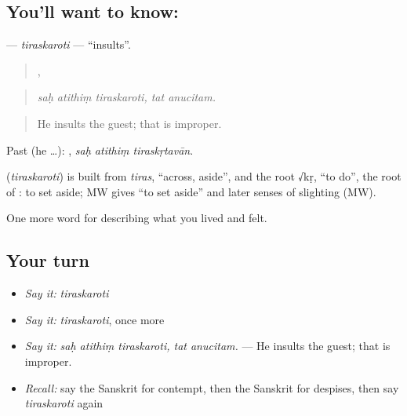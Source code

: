\subsection*{You'll want to know: }
\textbf{} — \emph{tiraskaroti} — \textquotedblleft{}insults\textquotedblright{}.

\begin{quote}
  ,  
\end{quote}

\begin{quote}
\emph{saḥ atithiṃ tiraskaroti, tat anucitam.}
\end{quote}

\begin{quote}
He insults the guest; that is improper.
\end{quote}

Past (he …):   , \emph{saḥ atithiṃ tiraskṛtavān}.

\begin{cousinweb}
\textbf{} (\emph{tiraskaroti}) is built from \emph{tiras}, \textquotedblleft{}across, aside\textquotedblright{}, and the root √kṛ, \textquotedblleft{}to do\textquotedblright{}, the root of \textbf{}: to set aside; MW gives \textquotedblleft{}to set aside\textquotedblright{} and later senses of slighting (MW).
\end{cousinweb}

\begin{grammarlens}[title={What you've built}]
One more word for describing what you lived and felt.
\end{grammarlens}

\subsection*{Your turn}
\begin{itemize}
\raggedright
  \item \emph{Say it:} \emph{tiraskaroti}
  \item \emph{Say it:} \emph{tiraskaroti}, once more
  \item \emph{Say it:} \emph{saḥ atithiṃ tiraskaroti, tat anucitam.} — He insults the guest; that is improper.
  \item \emph{Recall:} say the Sanskrit for contempt, then the Sanskrit for despises, then say \emph{tiraskaroti} again
\end{itemize}

